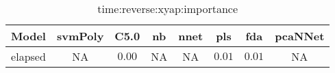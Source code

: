 \begin{table}[!ht]
	\centering
	\begin{tabular}{|c|c|c|c|c|c|c|c|}
		\hline
		Model & svmPoly & C5.0 & nb & nnet & pls & fda & pcaNNet \\ \hline
		elapsed & NA & $0.00$ & NA & NA & $0.01$ & $0.01$ & NA \\ \hline
	\end{tabular}
	\caption{time:reverse:xyap:importance}
	\label{tab:time:reverse:xyap:importance}
\end{table}
